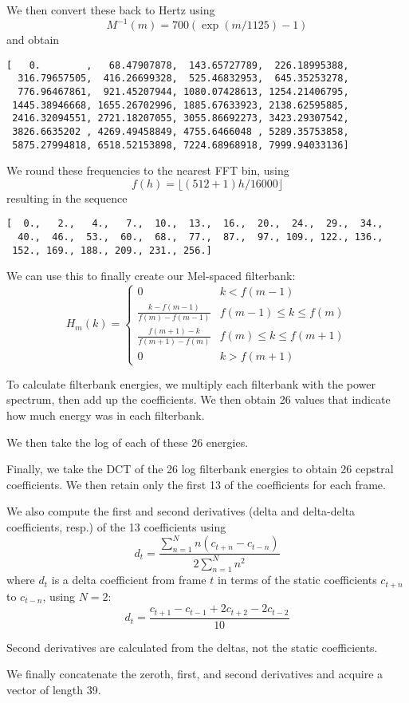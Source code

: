 \documentclass{article}
\begin{document}
We then convert these back to Hertz using
\begin{equation}
M^{-1}(m) = 700\left(\exp\left(m/1125\right)-1\right)
\end{equation}
and obtain
\begin{verbatim}
[   0.        ,   68.47907878,  143.65727789,  226.18995388,
  316.79657505,  416.26699328,  525.46832953,  645.35253278,
  776.96467861,  921.45207944, 1080.07428613, 1254.21406795,
 1445.38946668, 1655.26702996, 1885.67633923, 2138.62595885,
 2416.32094551, 2721.18207055, 3055.86692273, 3423.29307542,
 3826.6635202 , 4269.49458849, 4755.6466048 , 5289.35753858,
 5875.27994818, 6518.52153898, 7224.68968918, 7999.94033136]
\end{verbatim}

We round these frequencies to the nearest FFT bin, using
\begin{equation}
f(h) = \lfloor(512+1)h/16000\rfloor
\end{equation}
resulting in the sequence
\begin{verbatim}
[  0.,   2.,   4.,   7.,  10.,  13.,  16.,  20.,  24.,  29.,  34.,
  40.,  46.,  53.,  60.,  68.,  77.,  87.,  97., 109., 122., 136.,
 152., 169., 188., 209., 231., 256.]
\end{verbatim}

We can use this to finally create our Mel-spaced filterbank:
\begin{equation}
H_m(k) = \begin{cases}
0 & k<f(m-1)\\
\frac{k-f(m-1)}{f(m)-f(m-1)} & f(m-1)\leq k \leq f(m) \\
\frac{f(m+1) - k}{f(m+1)-f(m)} & f(m) \leq k \leq f(m+1)\\
0 & k > f(m+1)
\end{cases}
\end{equation}


To calculate filterbank energies, we multiply each filterbank with the power spectrum, then add up the coefficients. We then obtain 26 values that indicate how much energy was in each filterbank.

We then take the log of each of these 26 energies.

Finally, we take the DCT of the 26 log filterbank energies to obtain 26 cepstral coefficients. We then retain only the first 13 of the coefficients for each frame.

We also compute the first and second derivatives (delta and delta-delta coefficients, resp.) of the 13 coefficients using
\begin{equation}
d_t = \frac{\sum^N_{n=1}n\left(c_{t+n}-c_{t-n}\right)}{2\sum_{n=1}^Nn^2}
\end{equation}
where $d_t$ is a delta coefficient from frame $t$ in terms of the static coefficients $c_{t+n}$ to $c_{t-n}$, using $N=2$:
\begin{equation}
d_t = \frac{c_{t+1}-c_{t-1}+2c_{t+2}-2c_{t-2}}{10}
\end{equation}

Second derivatives are calculated from the deltas, not the static coefficients.

We finally concatenate the zeroth, first, and second derivatives and acquire a vector of length 39.
\end{document}
